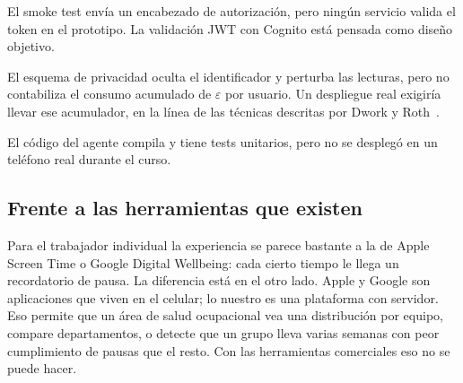 \documentclass[conference]{IEEEtran}
\begin{document}
El smoke test envía un encabezado de autorización, pero ningún 
servicio valida el token en el prototipo. La validación JWT con 
Cognito está pensada como diseño objetivo.

El esquema de privacidad oculta el identificador y perturba las 
lecturas, pero no contabiliza el consumo acumulado de $\varepsilon$ 
por usuario. Un despliegue real exigiría llevar ese acumulador, 
en la línea de las técnicas descritas por Dwork y 
Roth~\cite{dwork2014}.

El código del agente compila y tiene tests unitarios, pero no se 
desplegó en un teléfono real durante el curso.

\subsection*{Frente a las herramientas que existen}

Para el trabajador individual la experiencia se parece bastante a 
la de Apple Screen Time o Google Digital Wellbeing: cada cierto 
tiempo le llega un recordatorio de pausa. La diferencia está en el 
otro lado. Apple y Google son aplicaciones que viven en el celular; 
lo nuestro es una plataforma con servidor. Eso permite que un área 
de salud ocupacional vea una distribución por equipo, compare 
departamentos, o detecte que un grupo lleva varias semanas con 
peor cumplimiento de pausas que el resto. Con las herramientas 
comerciales eso no se puede hacer.
\end{document}
